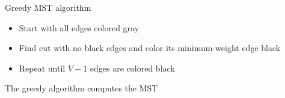 \documentclass[8pt,a4paper,compress]{beamer}
\begin{document}
\begin{frame}[fragile]
\pause

\begin{minipage}{200pt}
Greedy MST algorithm
\begin{itemize}
\item Start with all edges colored gray

\item Find cut with no black edges and color its minimum-weight edge black

\item Repeat until $V - 1$ edges are colored black
\end{itemize}

\pause
\bigskip

The greedy algorithm computes the MST

\pause
\bigskip


\end{minipage}
\end{frame}
\end{document}
